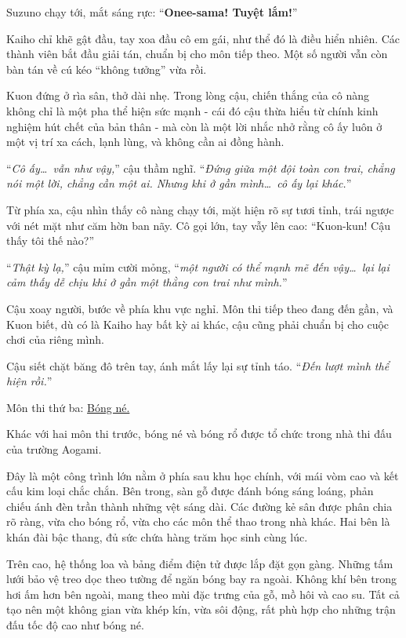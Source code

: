 \documentclass[../main.tex]{subfiles}
\begin{document}
Suzuno chạy tới, mắt sáng rực: ``\textbf{Onee-sama! Tuyệt lắm!}''

Kaiho chỉ khẽ gật đầu, tay xoa đầu cô em gái, như thể đó là điều hiển nhiên. Các thành viên bắt đầu giải tán, chuẩn bị cho môn tiếp theo. Một số người vẫn còn bàn tán về cú kéo ``không tưởng'' vừa rồi.

Kuon đứng ở rìa sân, thở dài nhẹ. Trong lòng cậu, chiến thắng của cô nàng không chỉ là một pha thể hiện sức mạnh - cái đó cậu thừa hiểu từ chính kinh nghiệm hút chết của bản thân - mà còn là một lời nhắc nhở rằng cô ấy luôn ở một vị trí xa cách, lạnh lùng, và không cần ai đồng hành.

``\textit{Cô ấy\dots\ vẫn như vậy,}'' cậu thầm nghĩ. ``\textit{Đứng giữa một đội toàn con trai, chẳng nói một lời, chẳng cần một ai. Nhưng khi ở gần mình\dots\ cô ấy lại khác.}''

Từ phía xa, cậu nhìn thấy cô nàng chạy tới, mặt hiện rõ sự tươi tỉnh, trái ngược với nét mặt như căm hờn ban nãy. Cô gọi lớn, tay vẫy lên cao: ``Kuon-kun! Cậu thấy tôi thế nào?''

``\textit{Thật kỳ lạ,}'' cậu mỉm cười mỏng, ``\textit{một người có thể mạnh mẽ đến vậy\dots\ lại lại cảm thấy dễ chịu khi ở gần một thằng con trai như mình.}''

Cậu xoay người, bước về phía khu vực nghỉ. Môn thi tiếp theo đang đến gần, và Kuon biết, dù có là Kaiho hay bất kỳ ai khác, cậu cũng phải chuẩn bị cho cuộc chơi của riêng mình.

Cậu siết chặt băng đô trên tay, ánh mắt lấy lại sự tỉnh táo. ``\textit{Đến lượt mình thể hiện rồi.}''

\begin{center}
  {\color{vol} Môn thi thứ ba: \uline{Bóng né.}}
\end{center}

Khác với hai môn thi trước, bóng né và bóng rổ được tổ chức trong nhà thi đấu của trường Aogami.

Đây là một công trình lớn nằm ở phía sau khu học chính, với mái vòm cao và kết cấu kim loại chắc chắn. Bên trong, sàn gỗ được đánh bóng sáng loáng, phản chiếu ánh đèn trần thành những vệt sáng dài. Các đường kẻ sân được phân chia rõ ràng, vừa cho bóng rổ, vừa cho các môn thể thao trong nhà khác. Hai bên là khán đài bậc thang, đủ sức chứa hàng trăm học sinh cùng lúc.

Trên cao, hệ thống loa và bảng điểm điện tử được lắp đặt gọn gàng. Những tấm lưới bảo vệ treo dọc theo tường để ngăn bóng bay ra ngoài. Không khí bên trong hơi ấm hơn bên ngoài, mang theo mùi đặc trưng của gỗ, mồ hôi và cao su. Tất cả tạo nên một không gian vừa khép kín, vừa sôi động, rất phù hợp cho những trận đấu tốc độ cao như bóng né.
\end{document}
